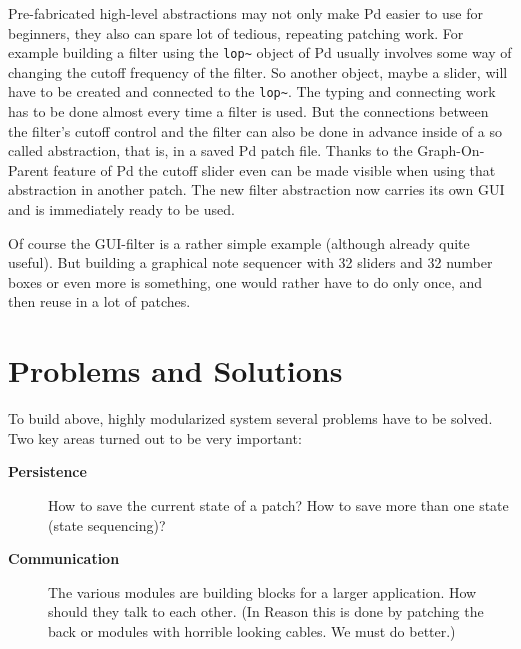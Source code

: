 \documentclass[10pt,english]{scrartcl}
\begin{document}
Pre-fabricated high-level abstractions may not only make Pd easier to use
for beginners, they also can spare lot of tedious, repeating patching work.
For example building a filter using the \texttt{lop{\~{ }}} object of Pd usually
involves some way of changing the cutoff frequency of the filter. So another
object, maybe a slider, will have to be created and connected to the
\texttt{lop{\~{ }}}. The typing and connecting work has to be done almost every time a
filter is used. But the connections between the filter's cutoff control and
the filter can also be done in advance inside of a so called abstraction,
that is, in a saved Pd patch file. Thanks to the Graph-On-Parent feature of
Pd the cutoff slider even can be made visible when using that abstraction in
another patch. The new filter abstraction now carries its own GUI and is
immediately ready to be used.

Of course the GUI-filter is a rather simple example (although already quite
useful). But building a graphical note sequencer with 32 sliders and 32
number boxes or even more is something, one would rather have to do only
once, and then reuse in a lot of patches.



\hypertarget{problems-and-solutions}{}
\section*{Problems and Solutions}

To build above, highly modularized system several problems have to be
solved. Two key areas turned out to be very important:
\begin{description}
\item[\textbf{Persistence}]

How to save the current state of a patch? How to save more than one
state (state sequencing)?

\item[\textbf{Communication}]

The various modules are building blocks for a larger application. How
should they talk to each other. (In Reason this is done by patching the
back or modules with horrible looking cables. We must do better.)

\end{description}
\end{document}
